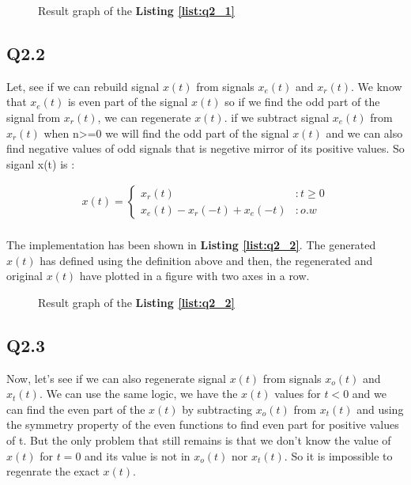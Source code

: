 \begin{figure}[H]
  \centering
  \scalebox{0.4}{}
  \caption{Result graph of the \textbf{Listing \ref{list:q2_1}}}
  \label{fig:Q2_1}
\end{figure}

\subsection{Q2.2}
Let, see if we can rebuild signal 
$x(t)$ from signals $x_e(t)$ and $x_r(t)$. We 
know that $x_e(t)$ is even part of the signal 
$x(t)$ so if we find the odd part of the signal 
from $x_r(t)$, we can regenerate $x(t)$. if we 
subtract signal $x_e(t)$ from $x_r(t)$ when n>=0 
we will find the odd part of the signal $x(t)$ and
 we can also find negative values of odd signals that is 
 negetive mirror of its positive values. So siganl x(t) is : 

 \begin{align}
  x(t) = \begin{cases}
  x_r(t) &: t \geq 0\\
  x_e(t) -x_r(-t)+x_e(-t)&: o.w\end{cases}
 \end{align}
\paragraph{}The implementation has been shown 
in \textbf{Listing \ref{list:q2_2}}. The generated 
$x(t)$ has defined using the definition above and 
then, the regenerated and original $x(t)$ have 
plotted in a figure with two axes in a row.

\begin{figure}[H]
  \centering
  \scalebox{0.4}{}
  \caption{Result graph of the \textbf{Listing \ref{list:q2_2}}}
  \label{fig:Q2_2}
\end{figure}

\subsection{Q2.3}
Now, let's see if we can also regenerate 
signal $x(t)$ from signals $x_o(t)$ and $x_t(t)$. We 
can use the same logic, we have the $x(t)$ values for 
$t<0$ and we can find the even part of the $x(t)$ 
by subtracting $x_o(t)$ from $x_t(t)$ and using the 
symmetry property of the even functions to find even 
part for positive values of t. But the only problem 
that still remains is that we don't know the value of 
$x(t)$ for $t=0$ and its value is not in $x_o(t)$ nor 
$x_t(t)$. So it is impossible to regenrate the exact 
$x(t)$.